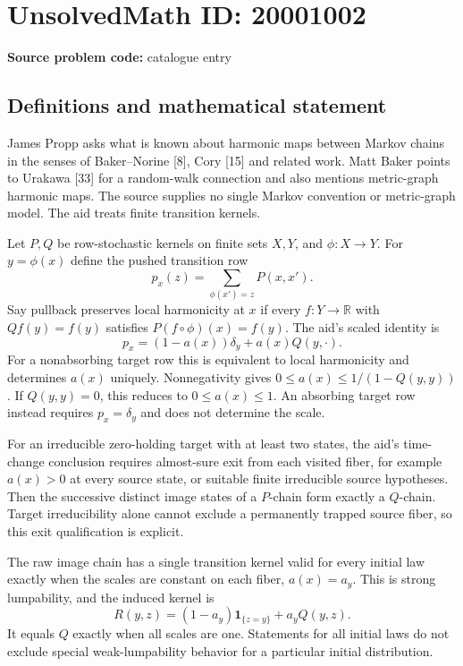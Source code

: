 \documentclass[11pt]{article}
\newcommand{\R}{\mathbb{R}}
\begin{document}
\section*{UnsolvedMath ID: 20001002}
\textbf{Source problem code:} catalogue entry
\subsection{Definitions and mathematical statement}
James Propp asks what is known about harmonic maps between Markov chains in the senses of Baker--Norine [8], Cory [15] and related work. Matt Baker points to Urakawa [33] for a random-walk connection and also mentions metric-graph harmonic maps. The source supplies no single Markov convention or metric-graph model. The aid treats finite transition kernels.

Let $P,Q$ be row-stochastic kernels on finite sets $X,Y$, and $\phi:X\to Y$. For $y=\phi(x)$ define the pushed transition row
\[
 p_x(z)=\sum_{\phi(x')=z}P(x,x').
\]
Say pullback preserves local harmonicity at $x$ if every $f:Y\to\R$ with $Qf(y)=f(y)$ satisfies $P(f\circ\phi)(x)=f(y)$. The aid's scaled identity is
\[
 p_x=(1-a(x))\delta_y+a(x)Q(y,\cdot).
\]
For a nonabsorbing target row this is equivalent to local harmonicity and determines $a(x)$ uniquely. Nonnegativity gives $0\leq a(x)\leq1/(1-Q(y,y))$. If $Q(y,y)=0$, this reduces to $0\leq a(x)\leq1$. An absorbing target row instead requires $p_x=\delta_y$ and does not determine the scale.

For an irreducible zero-holding target with at least two states, the aid's time-change conclusion requires almost-sure exit from each visited fiber, for example $a(x)>0$ at every source state, or suitable finite irreducible source hypotheses. Then the successive distinct image states of a $P$-chain form exactly a $Q$-chain. Target irreducibility alone cannot exclude a permanently trapped source fiber, so this exit qualification is explicit.

The raw image chain has a single transition kernel valid for every initial law exactly when the scales are constant on each fiber, $a(x)=a_y$. This is strong lumpability, and the induced kernel is
\[
 R(y,z)=(1-a_y)\mathbf1_{\{z=y\}}+a_yQ(y,z).
\]
It equals $Q$ exactly when all scales are one. Statements for all initial laws do not exclude special weak-lumpability behavior for a particular initial distribution.
\end{document}
